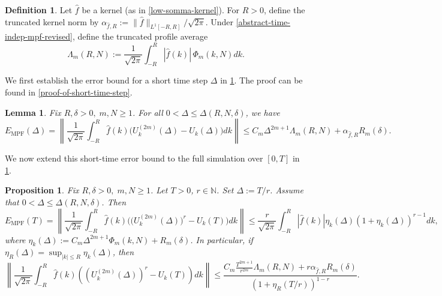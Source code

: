 \documentclass[10pt,reqno]{article}
\numberwithin{equation}{section}
\theoremstyle{plain}
\newtheorem{lem}[thm]{Lemma}
\newtheorem{prop}[thm]{Proposition}
\theoremstyle{definition}
\newtheorem{defn}[thm]{Definition}
\begin{document}
\begin{defn}\label{def:kernel-moments-and-profile}
Let \(\hat f\) be a kernel (as in \cref{low-somma-kernel}). For \(R>0\), define the truncated kernel norm by \(\alpha_{\hat f,R}:=\|\hat f\|_{L^1[-R,R]}/\sqrt{2\pi}\). Under \cref{abstract-time-indep-mpf-revised}, define the truncated profile average
\begin{equation}\label{eq:Lambda-cont}
\Lambda_m(R,N) := \frac{1}{\sqrt{2\pi}} \int_{-R}^{R} | \hat f (k)| \, \Phi_m(k,N) dk.
\end{equation}
\end{defn}

We first establish the error bound for a short time step \(\Delta\) in \cref{short-time-step}. The proof can be found in \cref{proof-of-short-time-step}. 

\begin{lem}
\label{short-time-step}
Fix $R, \delta > 0, \; m,N \geq 1$.
For all $0<\Delta\le \Delta(R,N,\delta)$, we have
\begin{equation}\label{eq:one-step-avg}
E_{\mathrm{MPF}} (\Delta) =
\left \| \frac{1}{\sqrt{2 \pi}} \int_{-R}^{R} \hat f(k)\big(U^{(2m)}_k(\Delta)-U_k(\Delta)\big)dk\right \|
\leq 
 C_m\Delta^{2m+1}\Lambda_m(R,N) + 
\alpha_{\hat f, R} R_m(\delta).
\end{equation}
\end{lem}

We now extend this short-time error bound to the full simulation over $[0,T]$ in \cref{long-time-step}.

\begin{prop}
\label{long-time-step}
Fix $R, \delta > 0, \; m,N \geq 1$. Let $T>0$, $r\in\mathbb{N}$. Set $\Delta := T/r$. Assume that $0< \Delta \le \Delta(R,N,\delta)$. Then
\begin{equation}\label{eq:long-time-avg-general}
E_{\mathrm{MPF}} (T) =
\left\| \frac{1}{\sqrt{2 \pi}} \int_{-R}^{R} \hat f(k)\Big(\big(U_k^{(2m)}(\Delta)\big)^r-U_k(T)\Big)dk \right\| \le \frac{r}{\sqrt{2 \pi}} \int_{-R}^{R} |\hat f(k)| \eta_k(\Delta) (1+\eta_k(\Delta) )^{r-1}dk,
\end{equation}
where $\eta_k(\Delta):=C_m \Delta ^{2m+1}\Phi_m(k,N)+R_m(\delta)$. In particular, if
$\eta_{R}(\Delta) = \sup_{|k| \leq R} \eta_k(\Delta)$, 
then
\begin{equation}\label{eq:long-time-avg-explicit}
\left\| \frac{1}{\sqrt{2 \pi}} \int_{-R}^{R} \hat f(k)\left((U_k^{(2m)}(\Delta))^r-U_k(T)\right)dk \right\| \le \frac{ C_m \frac{T^{2m+1}}{r^{2m}}\Lambda_m(R,N) + r \alpha_{\hat f, R} R_m(\delta) }{ (1+\eta_{R}(T/r))^{1-r}}.
\end{equation}
\end{prop}
\end{document}
